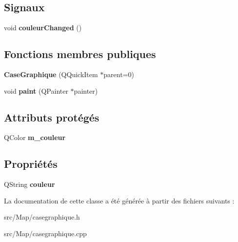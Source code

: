\subsection*{Signaux}
\begin{DoxyCompactItemize}
\item 
void {\bfseries couleur\+Changed} ()\hypertarget{class_case_graphique_a38480dc767a954d38aba3c2d8453a886}{}\label{class_case_graphique_a38480dc767a954d38aba3c2d8453a886}

\end{DoxyCompactItemize}
\subsection*{Fonctions membres publiques}
\begin{DoxyCompactItemize}
\item 
{\bfseries Case\+Graphique} (Q\+Quick\+Item $\ast$parent=0)\hypertarget{class_case_graphique_ac6a8ee4bfbd1e3c683066bae8157c41c}{}\label{class_case_graphique_ac6a8ee4bfbd1e3c683066bae8157c41c}

\item 
void {\bfseries paint} (Q\+Painter $\ast$painter)\hypertarget{class_case_graphique_a5ccb10775593928cfee6a4d5a5e9287c}{}\label{class_case_graphique_a5ccb10775593928cfee6a4d5a5e9287c}

\end{DoxyCompactItemize}
\subsection*{Attributs protégés}
\begin{DoxyCompactItemize}
\item 
Q\+Color {\bfseries m\+\_\+couleur}\hypertarget{class_case_graphique_ad2c0739e977728a58c6e8e8dc90440a0}{}\label{class_case_graphique_ad2c0739e977728a58c6e8e8dc90440a0}

\end{DoxyCompactItemize}
\subsection*{Propriétés}
\begin{DoxyCompactItemize}
\item 
Q\+String {\bfseries couleur}\hypertarget{class_case_graphique_abff90715a0c5492e141946eb99ee650a}{}\label{class_case_graphique_abff90715a0c5492e141946eb99ee650a}

\end{DoxyCompactItemize}


La documentation de cette classe a été générée à partir des fichiers suivants \+:\begin{DoxyCompactItemize}
\item 
src/\+Map/casegraphique.\+h\item 
src/\+Map/casegraphique.\+cpp\end{DoxyCompactItemize}
